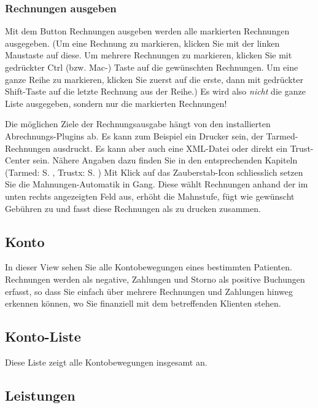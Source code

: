 \subsubsection{Rechnungen ausgeben}
Mit dem Button \glqq Rechnungen ausgeben\grqq{} werden alle markierten Rechnungen ausgegeben. (Um eine Rechnung zu markieren, klicken Sie mit der linken Maustaste auf diese. Um mehrere Rechnungen zu markieren, klicken Sie mit gedrückter Ctrl (bzw. Mac-) Taste auf die gewünschten Rechnungen. Um eine ganze Reihe zu markieren, klicken Sie zuerst auf die erste, dann mit gedrückter Shift-Taste auf die letzte Rechnung aus der Reihe.) Es wird also \textit{nicht} die ganze Liste ausgegeben, sondern nur die markierten Rechnungen!


Die möglichen Ziele der Rechnungsausgabe hängt von den installierten Abrechnungs-Plugins ab. Es kann zum Beispiel ein Drucker sein, der Tarmed-Rechnungen ausdruckt. Es kann aber auch eine XML-Datei oder direkt ein Trust-Center sein. Nähere Angaben dazu finden Sie in den entsprechenden Kapiteln (Tarmed: S. \pageref{arzttarife}, Trustx: S. \pageref{trustx})
\bigskip
Mit Klick auf das Zauberstab-Icon schliesslich setzen Sie die Mahnungen-Automatik in Gang. Diese wählt Rechnungen anhand der im unten rechts angezeigten Feld aus, erhöht die Mahnstufe, fügt wie gewünscht Gebühren zu und fasst diese Rechnungen als \glqq zu drucken\grqq{} zusammen.

\subsection{Konto}
In dieser View sehen Sie alle Kontobewegungen eines bestimmten Patienten.
Rechnungen werden als negative, Zahlungen und Storno als positive
Buchungen erfasst, so dass Sie einfach über mehrere Rechnungen und Zahlungen
hinweg erkennen können, wo Sie finanziell mit dem betreffenden Klienten stehen.

\subsection{Konto-Liste}
Diese Liste zeigt alle Kontobewegungen insgesamt an.

\subsection{Leistungen}




